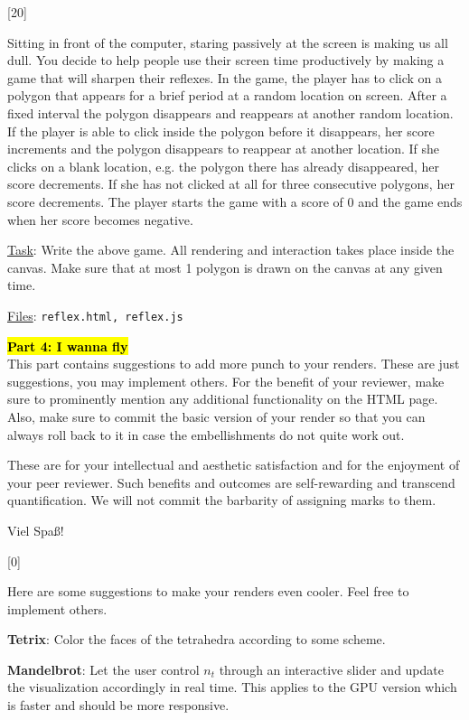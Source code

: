 \documentclass[addpoints]{exam}
\begin{document}
\begin{questions}
[20]

  Sitting in front of the computer, staring passively at the screen is making us all dull. You decide to help people use their screen time productively by making a game that will sharpen their reflexes. In the game, the player has to click on a polygon that appears for a brief period at a random location on screen. After a fixed interval the polygon disappears and reappears at another random location. If the player is able to click inside the polygon before it disappears, her score increments and the polygon disappears to reappear at another location. If she clicks on a blank location, e.g. the polygon there has already disappeared, her score decrements. If she has not clicked at all for three consecutive polygons, her score decrements. The player starts the game with a score of 0 and the game ends when her score becomes negative.

  \underline{Task}: Write the above game. All rendering and interaction takes place inside the canvas. Make sure that at most 1 polygon is drawn on the canvas at any given time.
  
  \underline{Files}: {\tt reflex.html, reflex.js}

  \begin{EnvFullwidth}
    {\Large\bf \hl{Part 4: I wanna fly}}\\
    This part contains suggestions to add more punch to your renders. These are just suggestions, you may implement others. For the benefit of your reviewer, make sure to prominently mention any additional functionality on the HTML page. Also, make sure to commit the basic version of your render so that you can always roll back to it in case the embellishments do not quite work out.

    These are for your intellectual and aesthetic satisfaction and for the enjoyment of your peer reviewer. Such benefits and outcomes are self-rewarding and transcend quantification. We will not commit the barbarity of assigning marks to them.

    Viel Spa\ss!
  \end{EnvFullwidth}

[0]

  Here are some suggestions to make your renders even cooler. Feel free to implement others.

  \textbf{Tetrix}: Color the faces of the tetrahedra according to some scheme.
  
  \textbf{Mandelbrot}: Let the user control $n_t$ through an interactive slider and update the visualization accordingly in real time. This applies to the GPU version which is faster and should be more responsive.
  

\end{questions}
\end{document}
